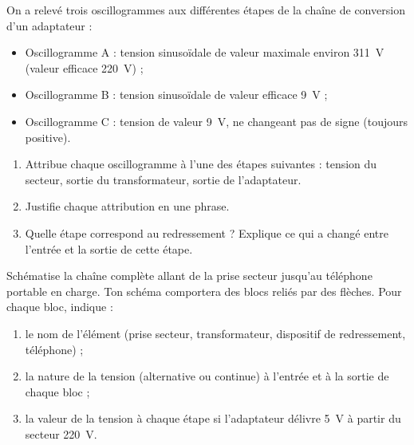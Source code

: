 \documentclass[11pt]{article}
\begin{document}
\begin{exercice}
On a relevé trois oscillogrammes aux différentes étapes de la chaîne de conversion d'un adaptateur :

\begin{itemize}
\item Oscillogramme A : tension sinusoïdale de valeur maximale environ \SI{311}{V} (valeur efficace \SI{220}{V}) ;
\item Oscillogramme B : tension sinusoïdale de valeur efficace \SI{9}{V} ;
\item Oscillogramme C : tension de valeur \SI{9}{V}, ne changeant pas de signe (toujours positive).
\end{itemize}

\begin{enumerate}
\item Attribue chaque oscillogramme à l'une des étapes suivantes : tension du secteur, sortie du transformateur, sortie de l'adaptateur.
\item Justifie chaque attribution en une phrase.
\item Quelle étape correspond au redressement ? Explique ce qui a changé entre l'entrée et la sortie de cette étape.
\end{enumerate}
\end{exercice}

\begin{exercice}
Schématise la chaîne complète allant de la prise secteur jusqu'au téléphone portable en charge. Ton schéma comportera des blocs reliés par des flèches. Pour chaque bloc, indique :
\begin{enumerate}
\item le nom de l'élément (prise secteur, transformateur, dispositif de redressement, téléphone) ;
\item la nature de la tension (alternative ou continue) à l'entrée et à la sortie de chaque bloc ;
\item la valeur de la tension à chaque étape si l'adaptateur délivre \SI{5}{V} à partir du secteur \SI{220}{V}.
\end{enumerate}
\end{exercice}
\end{document}
